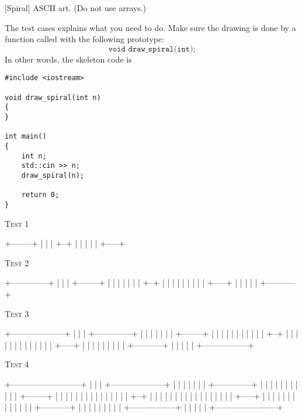 [Spiral]
ASCII art.
(Do not use arrays.)

The test cases explains what you need to do.
Make sure the drawing is done by a function called with the
following prototype:
\[
\texttt{void draw\_spiral(int);}
\]
In other words, the skeleton code is
\begin{Verbatim}[frame=single]
#include <iostream>

void draw_spiral(int n)
{
}

int main()
{
    int n;
    std::cin >> n;
    draw_spiral(n);

    return 0;
}
\end{Verbatim}

\textsc{Test 1}
\begin{console}[commandchars=\\\{\}]
+--------+
|        |
|  +--+  |
|  |     |
|  +-----+
\end{console}

\textsc{Test 2}
\begin{console}[commandchars=\\\{\}]
+--------------+
|              |
|  +--------+  |
|  |        |  |
|  |  +--+  |  |
|  |  |     |  |
|  |  +-----+  |
|  |           |
|  +-----------+
\end{console}

\textsc{Test 3}
\begin{console}[commandchars=\\\{\}]
+--------------------+
|                    |
|  +--------------+  |
|  |              |  |
|  |  +--------+  |  |
|  |  |        |  |  |
|  |  |  +--+  |  |  |
|  |  |  |     |  |  |
|  |  |  +-----+  |  |
|  |  |           |  |
|  |  +-----------+  |
|  |                 |
|  +-----------------+
\end{console}

\textsc{Test 4}
\begin{console}[commandchars=\\\{\}]
+--------------------------+
|                          |
|  +--------------------+  |
|  |                    |  |
|  |  +--------------+  |  |
|  |  |              |  |  |
|  |  |  +--------+  |  |  |
|  |  |  |        |  |  |  |
|  |  |  |  +--+  |  |  |  |
|  |  |  |  |     |  |  |  |
|  |  |  |  +-----+  |  |  |
|  |  |  |           |  |  |
|  |  |  +-----------+  |  |
|  |  |                 |  |
|  |  +-----------------+  |
|  |                       |
|  +-----------------------+
\end{console}

